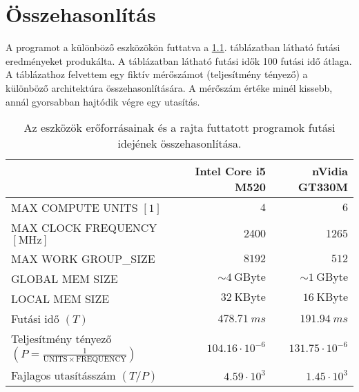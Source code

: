 \chapter{Összehasonlítás}
\cbstart
	A programot a különböző eszközökön futtatva a \ref{table:results}. táblázatban látható futási
	eredményeket produkálta. A táblázatban látható futási idők 100 futási idő átlaga.
	A táblázathoz felvettem egy fiktív mérőszámot (teljesítmény tényező) a különböző architektúra
	összehasonlítására.
	A mérőszám értéke minél kissebb, annál gyorsabban hajtódik végre egy utasítás.
	\begin{table}[H]
	\footnotesize
	\centering
	\caption[Eszközök futási idejének összehasonlítása]{Az eszközök erőforrásainak és a rajta futtatott
	programok futási idejének összehasonlítása.}
	\label{table:results}
	\setlength{\extrarowheight}{8pt}
	\begin{tabular}{ l | r | r}
		 & Intel Core i5 M520 & nVidia GT330M \\ \hline
		MAX COMPUTE UNITS $[1]$ & $4$ & $6$\\
		MAX CLOCK FREQUENCY $[\mathrm{MHz}]$ & 2400 & 1265 \\
		MAX WORK GROUP\_SIZE & $8192$ & $512$ \\ \hline\hline
		GLOBAL MEM SIZE & $\sim 4\ \mathrm{GByte}$ & $\sim 1\ \mathrm{GByte}$\\
		LOCAL MEM SIZE & $32\ \mathrm{KByte}$ & $16\ \mathrm{KByte}$\\ \hline\hline
		Futási idő $(T)$ & $478.71\ ms$ & $191.94\ ms$\\
		Teljesítmény tényező $\left(P=\frac{1}{\mathrm{UNITS}\times \mathrm{FREQUENCY}}\right)$ &
		$104.16\cdot 10^{-6}$ & $131.75\cdot 10^{-6}$\\
		Fajlagos utasításszám $(T/P)$ &  $4.59\cdot 10^3$ & $1.45\cdot 10^3$ 
	\end{tabular}
	\end{table}
